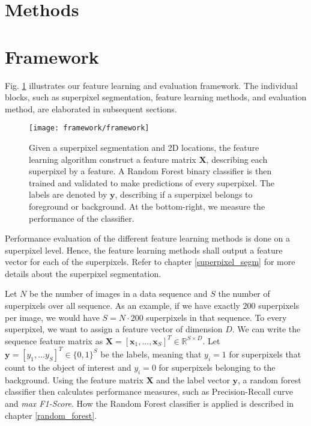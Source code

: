 \section{Methods}
\label{sec:feat_method}

\section{Framework} \label{framework}
Fig. \ref{fig:Framework} illustrates our feature learning and evaluation framework. The individual blocks, such as superpixel segmentation, feature learning methods, and evaluation method, are elaborated in subsequent sections.

\begin{figure}[!htpb]
  \centering
  \texttt{[image: framework/framework]}
  \caption[Framework description]{Given a superpixel segmentation and 2D locations, the feature learning algorithm construct a feature matrix $\boldsymbol{X}$, describing each superpixel by a feature. A Random Forest binary classifier is then trained and validated to make predictions of every superpixel. The labels are denoted by $\boldsymbol{y}$, describing if a superpixel belongs to foreground or background. At the bottom-right, we measure the performance of the classifier.}
  \label{fig:Framework}
\end{figure}

Performance evaluation of the different feature learning methods is done on a superpixel level. Hence, the feature learning methods shall output a feature vector for each of the superpixels. Refer to chapter \ref{superpixel_segm} for more details about the superpixel segmentation.

Let $N$ be the number of images in a data sequence and $S$ the number of superpixels over all sequence. As an example, if we have exactly $200$ superpixels per image, we would have $S=N \cdot 200$ superpixels in that sequence. To every superpixel, we want to assign a feature vector of dimension $D$. We can write the sequence feature matrix as $\boldsymbol{X} = [\boldsymbol{x}_1,...,\boldsymbol{x}_S]^T \in \mathbb{R}^{S \times D}$. Let $\boldsymbol{y} = [y_1,...y_S]^T \in \{0,1\}^S$ be the labels, meaning that $y_i=1$ for superpixels that count to the object of interest and $y_i=0$ for superpixels belonging to the background. Using the feature matrix $\boldsymbol{X}$ and the label vector $\boldsymbol{y}$, a random forest classifier then calculates performance measures, such as Precision-Recall curve and \textit{max F1-Score}. How the Random Forest classifier is applied is described in chapter \ref{random_forest}.

